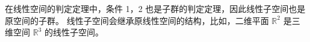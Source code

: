 \begin{note}
    在线性空间的判定定理中，条件 1，2 也是子群的判定定理，因此线性子空间也是原空间的子群。
    线性子空间会继承原线性空间的结构，比如，二维平面 $ \mathbb{R}^2 $ 是三维空间 $ \mathbb{R}^3 $ 的线性子空间。
\end{note}


\newpage